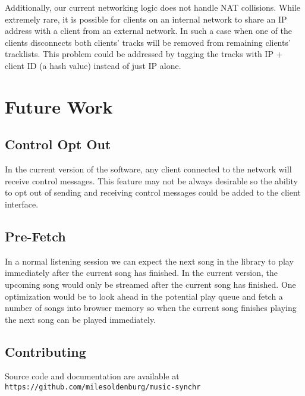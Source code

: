 \documentclass[12pt]{article}
\begin{document}
Additionally, our current networking logic does not handle NAT collisions. While extremely rare, it is possible for clients on an internal network to share an IP address with a client from an external network. In such a case when one of the clients disconnects both clients' tracks will be removed from remaining clients' tracklists. This problem could be addressed by tagging the tracks with IP + client ID (a hash value) instead of just IP alone.

\section{Future Work}

\subsection{Control Opt Out}
In the current version of the software, any client connected to the network will receive control messages. This feature may not be always desirable so the ability to opt out of sending and receiving control messages could be added to the client interface.

\subsection{Pre-Fetch}
In a normal listening session we can expect the next song in the library to play immediately after the current song has finished. In the current version, the upcoming song would only be streamed after the current song has finished. One optimization would be to look ahead in the potential play queue and fetch a number of songs into browser memory so when the current song finishes playing the next song can be played immediately.

\subsection{Contributing}
\begin{center}
Source code and documentation are available at
{\tt https://github.com/milesoldenburg/music-synchr}
\end{center}
\end{document}
